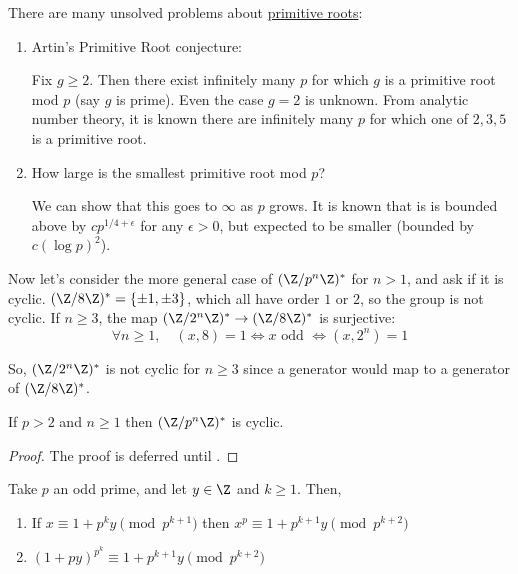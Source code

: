 \documentclass{article}
\begin{document}
There are many unsolved problems about \hyperlink{def:primRoot}{primitive roots}:
\begin{enumerate}
    \item Artin's Primitive Root conjecture:

        Fix $g \geq 2$. Then there exist infinitely many $p$ for which $g$ is a primitive root mod $p$ (say $g$ is prime).
        Even the case $g=2$ is unknown.
        From analytic number theory, it is known there are infinitely many $p$ for which one of $2, 3, 5$ is a primitive root.
    \item How large is the smallest primitive root mod $p$?

        We can show that this goes to $\infty$ as $p$ grows.
        It is known that is is bounded above by $c p^{1/4 + \epsilon}$ for any $\epsilon > 0$, but expected to be smaller (bounded by $c (\log p)^2$).
\end{enumerate}

Now let's consider the more general case of $(\Z / p^n \Z)^*$ for $n > 1$, and ask if it is cyclic.
$(\Z / 8 \Z)^* = \{\pm 1, \pm 3\}$, which all have order $1$ or $2$, so the group is not cyclic.  If $n \geq 3$, the map $(\Z/2^n \Z)^* \to (\Z/8 \Z)^*$ is surjective:
\begin{equation*}\forall n \geq 1, \quad (x, 8) = 1 \iff x \text{ odd } \iff (x, 2^n) = 1 \end{equation*}

So, $(\Z/2^n \Z)^*$ is not cyclic for $n \geq 3$ since a generator would map to a generator of $(\Z / 8 \Z)^*$.

\begin{nthm}\label{thm:2.9}
    If $p > 2$ and $n \geq 1$ then $(\Z/p^n \Z)^*$ is cyclic.
\end{nthm}

\begin{proof}
    The proof is deferred until .
\end{proof}

\begin{nlemma}\label{lem:2.10}
    Take $p$ an odd prime, and let $y \in \Z$ and $k \geq 1$. Then,
    \begin{enumerate}[label=(\roman*)]
        \item If $x \equiv 1 + p^k y \pmod{p^{k+1}}$ then $x^p \equiv 1 + p^{k+1} y \pmod{p^{k+2}}$
        \item $(1 + p y)^{p^k} \equiv 1 + p^{k+1} y \pmod{p^{k+2}}$
    \end{enumerate}
\end{nlemma}
\end{document}

